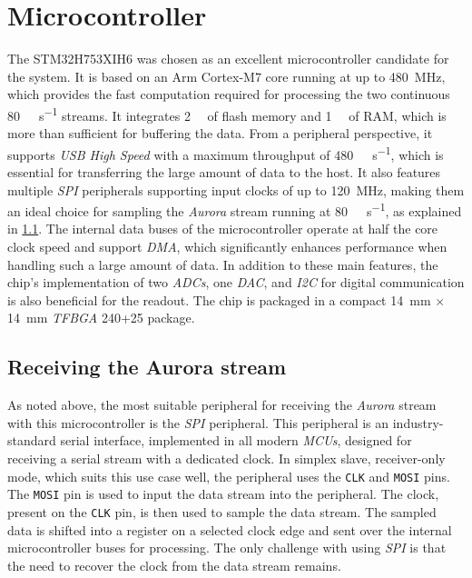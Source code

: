 \section{Microcontroller}
The STM32H753XIH6 was chosen as an excellent microcontroller candidate for the system. It is based on an Arm Cortex-M7 core running at up to \SI{480}{\mega\hertz}, which provides the fast computation required for processing the two continuous \SI{80}{\mega\bit\per\second} streams. It integrates \SI{2}{\mega\byte} of flash memory and \SI{1}{\mega\byte} of RAM, which is more than sufficient for buffering the data. From a peripheral perspective, it supports \emph{USB High Speed} with a maximum throughput of \SI{480}{\mega\bit\per\second}, which is essential for transferring the large amount of data to the host. It also features multiple \emph{SPI} peripherals supporting input clocks of up to \SI{120}{\mega\hertz}, making them an ideal choice for sampling the \emph{Aurora} stream running at \SI{80}{\mega\bit\per\second}, as explained in \ref{sec:aurora_sampling}. The internal data buses of the microcontroller operate at half the core clock speed and support \emph{DMA}, which significantly enhances performance when handling such a large amount of data. In addition to these main features, the chip's implementation of two \emph{ADCs}, one \emph{DAC}, and \emph{I2C} for digital communication is also beneficial for the readout. The chip is packaged in a compact \SI{14}{\milli\meter} $\times$ \SI{14}{\milli\meter} \emph{TFBGA} 240+25 package.

\subsection{Receiving the Aurora stream}
\label{sec:aurora_sampling}
As noted above, the most suitable peripheral for receiving the \emph{Aurora} stream with this microcontroller is the \emph{SPI} peripheral. This peripheral is an industry-standard serial interface, implemented in all modern \textit{MCUs}, designed for receiving a serial stream with a dedicated clock. In simplex slave, receiver-only mode, which suits this use case well, the peripheral uses the \verb|CLK| and \verb|MOSI| pins. The \verb|MOSI| pin is used to input the data stream into the peripheral. The clock, present on the \verb|CLK| pin, is then used to sample the data stream. The sampled data is shifted into a register on a selected clock edge and sent over the internal microcontroller buses for processing. The only challenge with using \emph{SPI} is that the need to recover the clock from the data stream remains.


